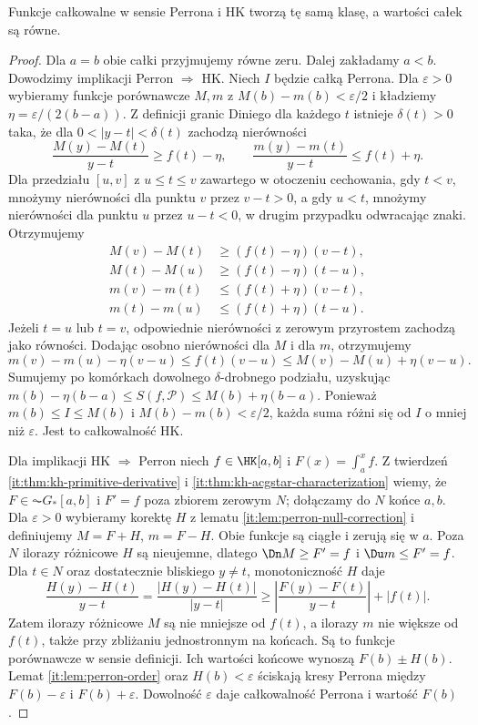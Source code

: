 \begin{twierdzenie}[Perron i HK]\label{it:thm:perron-hk}
Funkcje całkowalne w sensie Perrona i HK tworzą tę samą klasę, a wartości całek są równe.
\end{twierdzenie}
\begin{proof}
Dla $a=b$ obie całki przyjmujemy równe zeru. Dalej zakładamy $a<b$. Dowodzimy implikacji Perron $\Rightarrow$ HK. Niech $I$ będzie całką Perrona. Dla $\varepsilon>0$ wybieramy funkcje porównawcze $M,m$ z $M(b)-m(b)<\varepsilon/2$ i kładziemy $\eta=\varepsilon/(2(b-a))$. Z definicji granic Diniego dla każdego $t$ istnieje $\delta(t)>0$ taka, że dla $0<|y-t|<\delta(t)$ zachodzą nierówności
\[
\frac{M(y)-M(t)}{y-t}\ge f(t)-\eta,\qquad
\frac{m(y)-m(t)}{y-t}\le f(t)+\eta.
\]
Dla przedziału $[u,v]$ z $u\le t\le v$ zawartego w otoczeniu cechowania, gdy $t<v$, mnożymy nierówności dla punktu $v$ przez $v-t>0$, a gdy $u<t$, mnożymy nierówności dla punktu $u$ przez $u-t<0$, w drugim przypadku odwracając znaki. Otrzymujemy
\[
 \begin{aligned}
 M(v)-M(t)&\ge(f(t)-\eta)(v-t),\\
 M(t)-M(u)&\ge(f(t)-\eta)(t-u),\\
 m(v)-m(t)&\le(f(t)+\eta)(v-t),\\
 m(t)-m(u)&\le(f(t)+\eta)(t-u).
 \end{aligned}
\]
Jeżeli $t=u$ lub $t=v$, odpowiednie nierówności z zerowym przyrostem zachodzą jako równości. Dodając osobno nierówności dla $M$ i dla $m$, otrzymujemy
\[
m(v)-m(u)-\eta(v-u)\le f(t)(v-u)\le M(v)-M(u)+\eta(v-u).
\]
Sumujemy po komórkach dowolnego $\delta$-drobnego podziału, uzyskując $m(b)-\eta(b-a)\le S(f,\mathcal P)\le M(b)+\eta(b-a)$. Ponieważ $m(b)\le I\le M(b)$ i $M(b)-m(b)<\varepsilon/2$, każda suma różni się od $I$ o mniej niż $\varepsilon$. Jest to całkowalność HK.

Dla implikacji HK $\Rightarrow$ Perron niech $f\in\HK[a,b]$
i $F(x)=\int_a^x f$. Z twierdzeń
\ref{it:thm:kh-primitive-derivative} i
\ref{it:thm:kh-acgstar-characterization} wiemy, że
$F\in\AC G_*[a,b]$ i $F'=f$ poza zbiorem zerowym $N$;
dołączamy do $N$ końce $a,b$. Dla $\varepsilon>0$
wybieramy korektę $H$ z lematu \ref{it:lem:perron-null-correction}
i definiujemy $M=F+H$, $m=F-H$. Obie funkcje są ciągłe
i zerują się w $a$. Poza $N$ ilorazy różnicowe $H$ są
nieujemne, dlatego $\Dn M\ge F'=f$ i $\Du m\le F'=f$.
Dla $t\in N$ oraz dostatecznie bliskiego $y\ne t$,
monotoniczność $H$ daje
\[
 \frac{H(y)-H(t)}{y-t}
 =\frac{|H(y)-H(t)|}{|y-t|}
 \ge \left|\frac{F(y)-F(t)}{y-t}\right|+|f(t)|.
\]
Zatem ilorazy różnicowe $M$ są nie mniejsze od $f(t)$,
a ilorazy $m$ nie większe od $f(t)$, także przy
zbliżaniu jednostronnym na końcach. Są to funkcje
porównawcze w sensie definicji. Ich wartości końcowe
wynoszą $F(b)\pm H(b)$. Lemat \ref{it:lem:perron-order} oraz
$H(b)<\varepsilon$ ściskają kresy Perrona między
$F(b)-\varepsilon$ i $F(b)+\varepsilon$. Dowolność
$\varepsilon$ daje całkowalność Perrona i wartość $F(b)$.
\end{proof}
